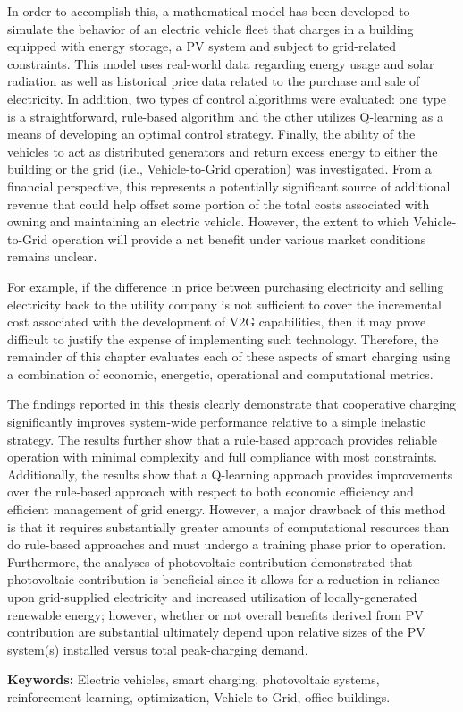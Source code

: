 In order to accomplish this, a mathematical model has been developed to simulate the behavior of an electric vehicle fleet that charges in a building equipped with energy storage, a PV system and subject to grid-related constraints. This model uses real-world data regarding energy usage and solar radiation as well as historical price data related to the purchase and sale of electricity. In addition, two types of control algorithms were evaluated: one type is a straightforward, rule-based algorithm and the other utilizes Q-learning as a means of developing an optimal control strategy. Finally, the ability of the vehicles to act as distributed generators and return excess energy to either the building or the grid (i.e., Vehicle-to-Grid operation) was investigated. From a financial perspective, this represents a potentially significant source of additional revenue that could help offset some portion of the total costs associated with owning and maintaining an electric vehicle. However, the extent to which Vehicle-to-Grid operation will provide a net benefit under various market conditions remains unclear.

For example, if the difference in price between purchasing electricity and selling electricity back to the utility company is not sufficient to cover the incremental cost associated with the development of V2G capabilities, then it may prove difficult to justify the expense of implementing such technology. Therefore, the remainder of this chapter evaluates each of these aspects of smart charging using a combination of economic, energetic, operational and computational metrics.

The findings reported in this thesis clearly demonstrate that cooperative charging significantly improves system-wide performance relative to a simple inelastic strategy. The results further show that a rule-based approach provides reliable operation with minimal complexity and full compliance with most constraints. Additionally, the results show that a Q-learning approach provides improvements over the rule-based approach with respect to both economic efficiency and efficient management of grid energy. However, a major drawback of this method is that it requires substantially greater amounts of computational resources than do rule-based approaches and must undergo a training phase prior to operation. Furthermore, the analyses of photovoltaic contribution demonstrated that photovoltaic contribution is beneficial since it allows for a reduction in reliance upon grid-supplied electricity and increased utilization of locally-generated renewable energy; however, whether or not overall benefits derived from PV contribution are substantial ultimately depend upon relative sizes of the PV system(s) installed versus total peak-charging demand.

\textbf{Keywords:} Electric vehicles, smart charging, photovoltaic systems, reinforcement learning, optimization, Vehicle-to-Grid, office buildings.

